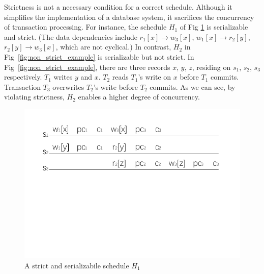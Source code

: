 \documentclass[conference]{IEEEtran}
\begin{document}
Strictness is not a necessary condition for a correct schedule.
Although it simplifies the implementation of a database system, it sacrifices the concurrency of transaction processing.
For instance, the schedule ${H_1}$ of Fig \ref{fig:strict_example} is serializable and strict. %
(The data dependencies include ${r_1[x] \rightarrow w_3[x]}$, ${w_1[x] \rightarrow r_2[y]}$, ${r_2[y] \rightarrow w_3[x]}$, which are not cyclical.)
In contrast, ${H_2}$ in Fig~\ref{fig:non_strict_example} is serializable but not strict.
In Fig~\ref{fig:non_strict_example}, there are three records ${x}$, ${y}$, ${z}$, residing on ${s_1}$, ${s_2}$, ${s_3}$ respectively.
${T_1}$ writes ${y}$ and ${x}$.
${T_2}$ reads ${T_1}$'s write on ${x}$ before ${T_1}$ commits.
Transaction ${T_3}$ overwrites ${T_2}$'s write before ${T_2}$ commits.
As we can see, by violating strictness, ${H_2}$  enables a higher degree of concurrency.

%
%




\begin{figure}[htbp]
  \centerline{\includegraphics[scale=1]{figure/schedule_strict.pdf}}
  \caption{A strict and serializabile schedule ${H_1}$}
  \label{fig:strict_example}
\end{figure}
\end{document}
